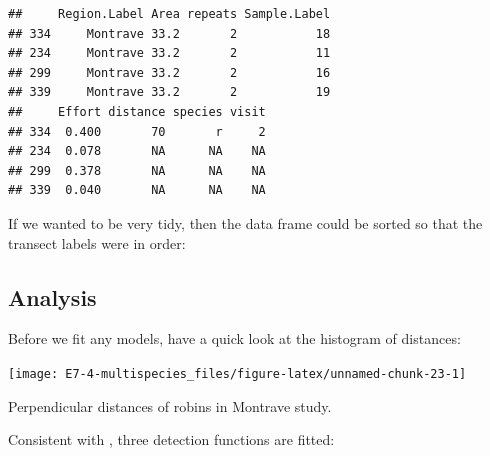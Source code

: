 \documentclass[10pt,a4paper]{tufte-handout}
\newenvironment{Shaded}{\begin{snugshade}}{\end{snugshade}}
\newcommand{\DataTypeTok}[1]{\textcolor[rgb]{0.13,0.29,0.53}{#1}}
\newcommand{\DecValTok}[1]{\textcolor[rgb]{0.00,0.00,0.81}{#1}}
\newcommand{\KeywordTok}[1]{\textcolor[rgb]{0.13,0.29,0.53}{\textbf{#1}}}
\newcommand{\NormalTok}[1]{#1}
\newcommand{\OperatorTok}[1]{\textcolor[rgb]{0.81,0.36,0.00}{\textbf{#1}}}
\newcommand{\StringTok}[1]{\textcolor[rgb]{0.31,0.60,0.02}{#1}}
\begin{document}
\begin{verbatim}
##     Region.Label Area repeats Sample.Label
## 334     Montrave 33.2       2           18
## 234     Montrave 33.2       2           11
## 299     Montrave 33.2       2           16
## 339     Montrave 33.2       2           19
##     Effort distance species visit
## 334  0.400       70       r     2
## 234  0.078       NA      NA    NA
## 299  0.378       NA      NA    NA
## 339  0.040       NA      NA    NA
\end{verbatim}

If we wanted to be very tidy, then the data frame could be sorted so
that the transect labels were in order:

\begin{Shaded}
\end{Shaded}

\hypertarget{analysis}{%
\subsection{Analysis}\label{analysis}}

Before we fit any models, have a quick look at the histogram of
distances:

\begin{Shaded}
\end{Shaded}

\begin{marginfigure}
\texttt{[image: E7-4-multispecies\_files/figure-latex/unnamed-chunk-23-1]} \caption[Perpendicular distances of robins in Montrave study]{Perpendicular distances of robins in Montrave study.}\label{fig:unnamed-chunk-23}
\end{marginfigure}

Consistent with \citet{buckland_distance_2015}, three detection
functions are fitted:
\end{document}
